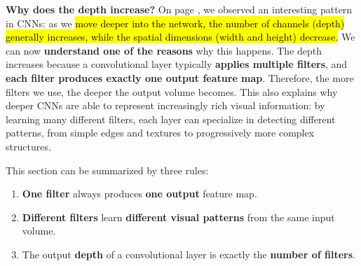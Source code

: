 \highspace
\textcolor{Green3}{ \textbf{Why does the depth increase?}} On page , we observed an interesting pattern in CNNs: as we \hl{move deeper into the network, the number of channels (depth) generally increases, while the spatial dimensions (width and height) decrease.} We can now \textbf{understand one of the reasons} why this happens. The depth increases because a convolutional layer typically \textbf{applies multiple filters}, and \textbf{each filter produces exactly one output feature map}. Therefore, the more filters we use, the deeper the output volume becomes. This also explains why deeper CNNs are able to represent increasingly rich visual information: by learning many different filters, each layer can specialize in detecting different patterns, from simple edges and textures to progressively more complex structures.

\highspace
\begin{takeawaysbox}
    This section can be summarized by three rules:
    \begin{enumerate}
        \item \textbf{One filter} always produces \textbf{one output} feature map.
        \item \textbf{Different filters} learn \textbf{different visual patterns} from the same input volume.
        \item The output \textbf{depth} of a convolutional layer is exactly the \textbf{number of filters}.
    \end{enumerate}
\end{takeawaysbox}
